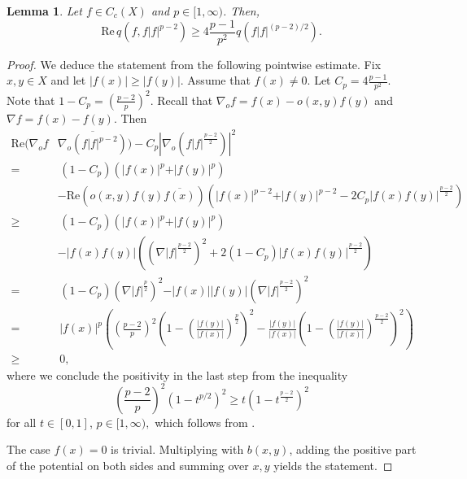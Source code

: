 \documentclass[10pt]{amsart}
\newtheorem{lemma}[theorem]{Lemma}
\theoremstyle{definition}
\begin{document}
\begin{lemma}\label{pFormEstimate}
    Let $  f\in C_c(X)$ and %
    $p\in [1,\infty)$. Then,
     \[\mathrm{Re}\, q(f,f\vert  f\vert^{p-2})\geq 4\frac{p-1}{p^2} q( f\vert  f\vert^{(p-2)\slash 2}).\]
\end{lemma}
\begin{proof}
    We deduce the statement from the following pointwise estimate.
    Fix $x,y\in X$ and let $\vert  f(x)\vert\geq\vert  f(y)\vert.$ Assume that $  f(x)\neq 0.$ Let $C_p = 4\frac{p-1}{p^2}.$ Note that $1-C_p = (\frac{p-2}{p})^2.$ Recall that $\nabla_{o} f=f(x)-o(x,y)f(y)$ and $\nabla f=f(x)-f(y)$. Then
\begin{align*}
\mathrm{Re}(\nabla_{o} f& \overline{\nabla_{o}(f\vert  f\vert^{p-2})})   - C_p\left|\nabla_{o}( f \vert  f\vert^{\frac{p-2}{2}})\right|^2\\
    =& \,(1-C_p)\left(\vert  f(x)\vert^p+\vert  f(y)\vert^p\right)
    \\& -\mathrm{Re}\left(o(x,y) f(y)\overline{f(x)}\right)\left(\vert f(x)\vert^{p-2}+\vert f(y)\vert^{p-2}-2C_p\vert f(x)f(y)\vert^{\frac{p-2}{2}} \right)\\
\geq&\, (1-C_p)\left(\vert  f(x)\vert^p+\vert  f(y)\vert^p\right)
    \\& - \left|  f(x)  f(y)\right|\left((\nabla |  f|^{\frac{p-2}{2}})^2 + 2(1-C_p)\vert  f(x)  f(y)\vert^{\frac{p-2}{2}} \right)\\
= &\,(1-C_p)\left(\nabla \vert  f \vert^{\frac{p}{2}} \right)^2-\vert  f(x)\vert\vert  f(y)\vert\left(\nabla \vert  f \vert^{\frac{p-2}{2}} \right)^2\\
=&\,  \vert  f(x)\vert^p\left(\left(\frac{p-2}{p}\right)^2\left(1-\left(\frac{\vert  f(y)\vert}{\vert  f(x)\vert}\right)^\frac{p}{2}\right)^2-\frac{\vert  f(y)\vert}{\vert  f(x)\vert}\left(1-\left(\frac{\vert  f(y)\vert}{\vert  f(x)\vert}\right)^{\frac{p-2}{2}}\right)^2\right)\\
\geq &\,0,
\end{align*}
where we conclude the positivity in the last step from the inequality
    \[\left(\frac{p-2}{p}\right)^2(1-t^{p\slash 2})^2\geq t(1-t^{\frac{p-2}{2}})^2\]
 for all $t\in [0,1]$, $p\in [1,\infty),$ which follows from \cite[Lemma 2.1, inequality~(2.4)]{LiSe}.
 
 The case $  f(x) = 0$ is trivial. Multiplying with $b(x,y)$, adding the positive part of the potential on both sides and summing over $x,y$ yields the statement.
\end{proof}
\end{document}
